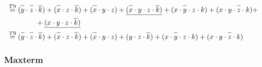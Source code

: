 \documentclass{article}
\newcommand*{\oline}[1]{\overline{#1\mathstrut}}
\newcommand{\bigspace}{\quad\quad\quad\quad}
\begin{document}
\begin{align*}
  &\overset{T9}{=} (\oline{y} \cdot \oline{z} \cdot \oline{k}) + (\oline{x} \cdot z \cdot \oline{k}) + (\oline{x} \cdot y \cdot z) + \underline{(\oline{x} \cdot y \cdot z \cdot \oline{k})} + (x \cdot \oline{y} \cdot z \cdot k) + (x \cdot y \cdot \oline{z} \cdot k) + \\
  &\bigspace + \underline{(x \cdot y \cdot z \cdot \oline{k})}\\
  &\overset{T9}{=} (\oline{y} \cdot \oline{z} \cdot \oline{k}) + (\oline{x} \cdot z \cdot \oline{k}) + (\oline{x} \cdot y \cdot z) + (y \cdot z \cdot \oline{k}) + (x \cdot \oline{y} \cdot z \cdot k) + (x \cdot y \cdot \oline{z} \cdot k)
\end{align*}

\newpage

\subsubsection*{Maxterm}
\end{document}
